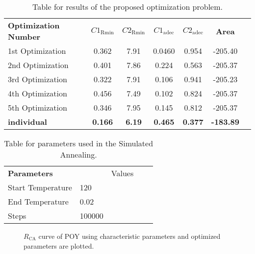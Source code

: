 \begin{table}[htbp]
\caption{Table for results of the proposed optimization problem.}
\begin{center}
\label{table:SAresults}
\begin{tabular}{l l c c c c c c}
& & \\ %
\hline
\textbf{Optimization Number} &  &\textbf{${C1}_{\mathrm{Rmin}}$} &\textbf{${C2}_{\mathrm{Rmin}}$} &\textbf{${C1}_{\mathrm{adec}}$} &\textbf{${C2}_{\mathrm{adec}}$} &  \textbf{Area}\\
\hline
1st Optimization  &  & 0.362 & 7.91 & 0.0460 & 0.954 & -205.40 \\
2nd Optimization  &  & 0.401 & 7.86 & 0.224 & 0.563 & -205.37 \\
3rd Optimization  &  & 0.322 & 7.91 & 0.106 & 0.941 & -205.23 \\
4th Optimization  &  & 0.456 & 7.49 & 0.102 & 0.824 & -205.37 \\
5th Optimization  &  & 0.346 & 7.95 & 0.145 & 0.812 & -205.37 \\
\textbf{individual}  &  & \textbf{0.166} & \textbf{6.19} & \textbf{0.465} & \textbf{0.377} & \textbf{-183.89} \\
\hline
\end{tabular}
\end{center}
\end{table}

\begin{table}[htbp]
\caption{Table for parameters used in the Simulated Annealing.}
\begin{center}
\label{table:SAparams}
\begin{tabular}{l l c c c}
& & \\ %
\hline
\textbf{Parameters} &   & Values \\
\hline
Start Temperature    &  120  \\
End Temperature      &  0.02 \\
Steps                & 100000 \\

\hline
\end{tabular}
\end{center}
\end{table}


\begin{figure}[htbp!]
\begin{center}
\end{center}
\caption{$R_{\mathrm{CA}}$ curve of POY using characteristic parameters and optimized parameters are plotted.}
\label{fig:CAR_optimParam} 
\end{figure}


